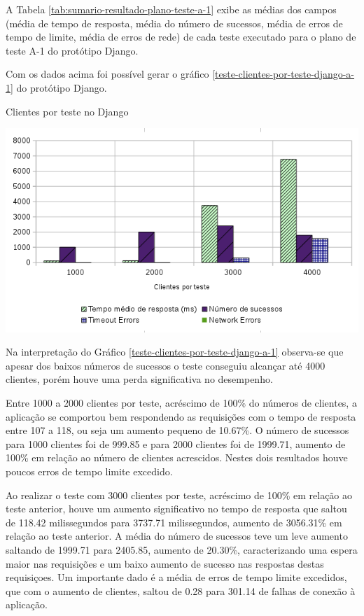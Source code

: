   A Tabela \ref{tab:sumario-resultado-plano-teste-a-1} exibe as médias dos campos (média de tempo de resposta,
  média do número de sucessos, média de erros de tempo de limite, média de erros de rede) de cada teste executado
  para o plano de teste A-1 do protótipo Django.

  Com os dados acima foi possível gerar o gráfico \ref{teste-clientes-por-teste-django-a-1} do
  protótipo Django.

  \begin{grafico}[H]
    \setlength{\abovecaptionskip}{5pt}
    \setlength{\belowcaptionskip}{0pt}
    
    \caption[Clientes por teste no Django]
	    {Clientes por teste no Django}
    \centering
    \includegraphics[width=.80\textwidth]{imagem/graficos/grafico_django_plano_de_teste_1.png}
    \captionsetup[grafico]{justification=centering}
    \label{teste-clientes-por-teste-django-a-1}
  \end{grafico}

  Na interpretação do Gráfico \ref{teste-clientes-por-teste-django-a-1}  observa-se que apesar dos baixos números de sucessos o teste
  conseguiu alcançar até 4000 clientes, porém houve uma perda significativa no desempenho.

  Entre 1000 a 2000 clientes por teste, acréscimo de 100\% do números de clientes, a aplicação se comportou bem respondendo as requisições com o tempo de resposta entre
  107 a 118, ou seja um aumento pequeno de 10.67\%. O número de sucessos para 1000 clientes foi de 999.85 e para 2000 clientes foi de 1999.71, aumento
  de 100\% em relação ao número de clientes acrescidos. Nestes dois resultados houve poucos erros de tempo limite excedido.

  Ao realizar o teste com 3000 clientes por teste, acréscimo de 100\% em relação ao teste anterior, houve um aumento significativo no tempo de resposta
  que saltou de 118.42 milissegundos para 3737.71 milissegundos, aumento de  3056.31\% em relação ao teste anterior. A média do número de sucessos
  teve um leve aumento saltando de 1999.71 para 2405.85, aumento de 20.30\%, caracterizando uma espera maior nas requisições e um baixo aumento
  de sucesso nas respostas destas requisiçoes. Um importante dado é a média de erros de tempo limite excedidos, que com o aumento de clientes,
  saltou de 0.28 para 301.14 de falhas de conexão à aplicação.

